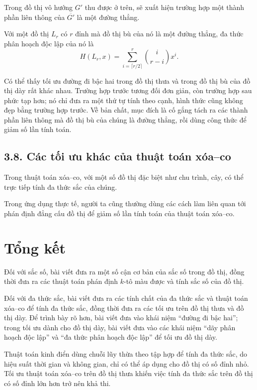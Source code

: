 \documentclass[11pt]{article}
\begin{document}
Trong đồ thị vô hướng \(G'\) thu được ở trên, sẽ xuất hiện trường hợp một
thành phần liên thông của \(\overline{G'}\) là một đường thẳng.

Với một đồ thị \(L_r\) có \(r\) đỉnh mà đồ thị bù của nó là một đường thẳng,
đa thức phân hoạch độc lập của nó là
\[
  H(L_r,x)=\sum_{i=\lceil r/2\rceil}^{r}\binom{i}{r-i}x^i.
\]

Có thể thấy tối ưu đường đi bậc hai trong đồ thị thưa và trong đồ thị bù của
đồ thị dày rất khác nhau. Trường hợp trước tương đối đơn giản, còn trường hợp
sau phức tạp hơn; nó chỉ đưa ra một thứ tự tính theo cạnh, hình thức cũng
không đẹp bằng trường hợp trước. Về bản chất, mục đích là cố gắng tách ra các
thành phần liên thông mà đồ thị bù của chúng là đường thẳng, rồi dùng công
thức để giảm số lần tính toán.

\subsection*{3.8. Các tối ưu khác của thuật toán xóa--co}

Trong thuật toán xóa--co, với một số đồ thị đặc biệt như chu trình, cây, có
thể trực tiếp tính đa thức sắc của chúng.

Trong ứng dụng thực tế, người ta cũng thường dùng các cách làm liên quan tới
phán định đẳng cấu đồ thị để giảm số lần tính toán của thuật toán xóa--co.

\section*{Tổng kết}

Đối với sắc số, bài viết đưa ra một số cận cơ bản của sắc số trong đồ thị,
đồng thời đưa ra các thuật toán phán định \(k\)-tô màu được và tính sắc số của
đồ thị.

Đối với đa thức sắc, bài viết đưa ra các tính chất của đa thức sắc và thuật
toán xóa--co để tính đa thức sắc, đồng thời đưa ra các tối ưu trên đồ thị thưa
và đồ thị dày. Để trình bày rõ hơn, bài viết đưa vào khái niệm ``đường đi bậc
hai''; trong tối ưu dành cho đồ thị dày, bài viết đưa vào các khái niệm ``dãy
phân hoạch độc lập'' và ``đa thức phân hoạch độc lập'' để tối ưu đồ thị dày.

Thuật toán kinh điển dùng chuỗi lũy thừa theo tập hợp để tính đa thức sắc, do
hiệu suất thời gian và không gian, chỉ có thể áp dụng cho đồ thị có số đỉnh
nhỏ. Tối ưu thuật toán xóa--co trên đồ thị thưa khiến việc tính đa thức sắc
trên đồ thị có số đỉnh lớn hơn trở nên khả thi.
\end{document}
